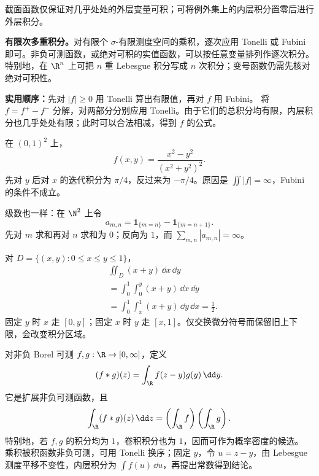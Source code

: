 截面函数仅保证对几乎处处的外层变量可积；可将例外集上的内层积分置零后进行外层积分。

\textbf{有限次多重积分。}对有限个 $\sigma$-有限测度空间的乘积，逐次应用 Tonelli 或 Fubini 即可。非负可测函数，或绝对可积的实值函数，可以按任意变量排列作逐次积分。特别地，在 $\R^n$ 上可把 $n$ 重 Lebesgue 积分写成 $n$ 次积分；变号函数仍需先核对绝对可积性。

\textbf{实用顺序：}先对 $|f|\ge0$ 用 Tonelli 算出有限值，再对 $f$ 用 Fubini。
将 $f=f^+-f^-$ 分解，对两部分分别应用 Tonelli。由于它们的总积分均有限，内层积分也几乎处处有限；此时可以合法相减，得到 $f$ 的公式。

在 $(0,1)^2$ 上，
\[
f(x,y)=\frac{x^2-y^2}{(x^2+y^2)^2}.
\]
先对 $y$ 后对 $x$ 的迭代积分为 $\pi/4$，反过来为 $-\pi/4$。原因是 $\iint|f|=\infty$，Fubini 的条件不成立。

级数也一样：在 $\N^2$ 上令
\[
a_{m,n}=\mathbf1_{\{m=n\}}-\mathbf1_{\{m=n+1\}}.
\]
先对 $m$ 求和再对 $n$ 求和为 $0$；反向为 $1$，而 $\sum_{m,n}|a_{m,n}|=\infty$。

对 $D=\{(x,y):0\le x\le y\le1\}$，
\[
\begin{aligned}
&\iint_D(x+y)\,\dd x\,\dd y\\
&=\int_0^1\int_0^y(x+y)\,\dd x\,\dd y\\
&=\int_0^1\int_x^1(x+y)\,\dd y\,\dd x
=\frac12.
\end{aligned}
\]
固定 $y$ 时 $x$ 走 $[0,y]$；固定 $x$ 时 $y$ 走 $[x,1]$。仅交换微分符号而保留旧上下限，会改变积分区域。

对非负 Borel 可测 $f,g:\R\to[0,\infty]$，定义
\[
(f*g)(z)=\int_{\R}f(z-y)g(y)\,\dd y.
\]
它是扩展非负可测函数，且
\[
\int_{\R}(f*g)(z)\,\dd z
=\left(\int_{\R}f\right)\left(\int_{\R}g\right).
\]
特别地，若 $f,g$ 的积分均为 $1$，卷积积分也为 $1$，因而可作为概率密度的候选。
乘积被积函数非负可测，可用 Tonelli 换序；固定 $y$，令 $u=z-y$，由 Lebesgue 测度平移不变性，内层积分为 $\int f(u)\,\dd u$，再提出常数得到结论。


